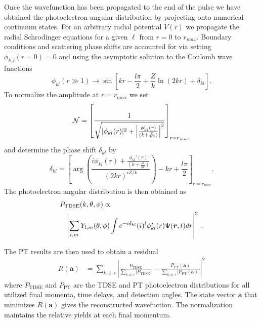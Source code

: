 Once the wavefunction has been propagated to the end of the pulse we have obtained the photoelectron angular distribution  by projecting onto numerical continuum states. For an arbitrary radial potential $V(r)$ we propagate the radial Schrodinger equations for a given $\ell$ from $r=0$ to $r_{max}$. Boundary conditions and scattering phase shifts are accounted for via setting $\phi_{k,l}(r=0)=0$ and using the asymptotic solution to the Coulomb wave functions
%
\begin{equation}
    \phi_{kl}(r\gg1) \rightarrow \sin\left[kr - \frac{l\pi}{2} +\frac{Z}{k} \ln(2kr) + \delta_{kl} \right].
\end{equation}
%
To normalize the amplitude at $r = r_{max}$ we set
%
\begin{equation}
    {\cal N} = \left[\frac{1}{\sqrt{|\phi_{kl}(r)|^2 + \left|\frac{\phi_{kl}'(r)}{(k+\frac{Z}{kr})}\right|^2}} \right]_{r=r_{max}}
\end{equation}
%
and determine the phase shift $\delta_{kl}$ by
%
\begin{equation}
    \delta_{kl} = \left[\arg\left(\frac{i\phi_{kl}(r) + \frac{\phi_{kl}'(r)}{(k+\frac{Z}{kr})} }{(2kr)^{iZ/k}}\right) - kr + \frac{l\pi}{2} \right]_{r=r_{max}}.
\end{equation}
%
The photoelectron angular distribution is then obtained as
%
\begin{eqnarray}
\lefteqn{P_{\text{TDSE}}(k,\theta,\phi) \propto}
    \\
    &&
    \left|\sum_{l,m} Y_{l,m}(\theta,\phi)\int  e^{-i\delta_{kl}}(i)^l \phi_{kl}^*(r) \Psi({\bm r},t) dr \right|^2 \; .
    \nonumber
\end{eqnarray}


The PT results are then used to obtain a residual 
%
\begin{align}
   R(\mathbf{a}) &=
   \sum_{k,\phi,\tau} \left|\frac{P_\text{TDSE}}{\sum\limits_{k,\phi,\tau}|P_\text{TDSE}|}-\frac{P_\text{PT}(\mathbf{a})}{\sum\limits_{k,\phi,\tau}|P_\text{PT}(\mathbf{a})|}\right|^2
   \label{eqn:residual}
\end{align}
%
where $P_\text{TDSE}$ and $P_\text{PT}$ are the TDSE and PT photoelectron distributions for all utilized final momenta, time delays, and detection angles. The state vector $\mathbf{a}$ that minimizes $R(\mathbf{a})$ gives the reconstructed wavefuction. The normalization maintains the relative yields at each final momentum.


